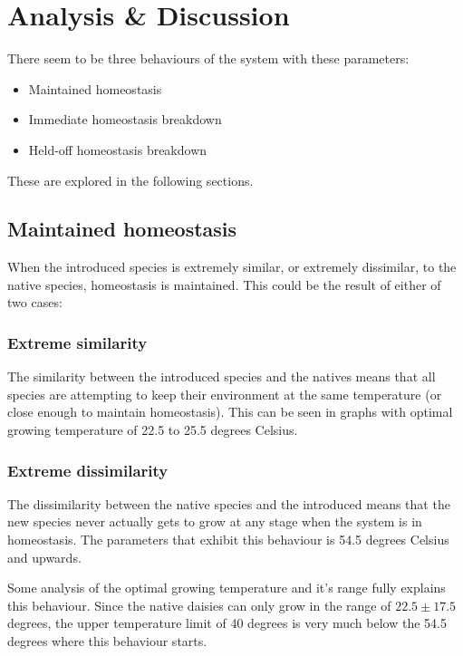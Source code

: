 \documentclass[12pt]{article}
\begin{document}

\section{Analysis \& Discussion}
There seem to be three behaviours of the system with these parameters:
\begin{itemize}
\item Maintained homeostasis
\item Immediate homeostasis breakdown
\item Held-off homeostasis breakdown
\end{itemize}

These are explored in the following sections.

\subsection{Maintained homeostasis}
When the introduced species is extremely similar, or extremely
dissimilar, to the native species, homeostasis is maintained. This
could be the result of either of two cases:
\subsubsection{Extreme similarity}
The similarity between the introduced species and the natives means
that all species are attempting to keep their environment at the same
temperature (or close enough to maintain homeostasis). This can be
seen in graphs with optimal growing temperature of 22.5 to 25.5
degrees Celsius.

\subsubsection{Extreme dissimilarity}
The dissimilarity between the native species and the introduced means
that the new species never actually gets to grow at any stage when the
system is in homeostasis. The parameters that exhibit this behaviour
is 54.5 degrees Celsius and upwards.

Some analysis of the optimal growing temperature and it's range fully
explains this behaviour. Since the native daisies can only grow in the
range of $22.5 \pm 17.5$ degrees, the upper temperature limit of 40
degrees is very much below the 54.5 degrees where this behaviour starts.
\end{document}
